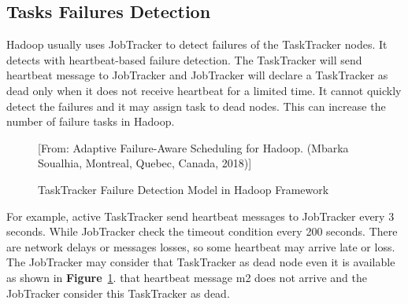 \documentclass[12pt,oneside,openright,a4paper]{cpe-english-project}
\begin{document}
\subsection{Tasks Failures Detection}
\hspace{10mm}Hadoop usually uses JobTracker to detect failures of the TaskTracker nodes.  It detects with heartbeat-based failure detection.  The TaskTracker will send heartbeat message to JobTracker and JobTracker will declare a TaskTracker as dead only when it does not receive heartbeat for a limited time.  It cannot quickly detect the failures and it may assign task to dead nodes.  This can increase the number of failure tasks in Hadoop. \cite{adaptiveScheduling}

\begin{figure}[!h]\centering
  \setlength{\fboxrule}{0mm} %
  \setlength{\fboxsep}{0cm}
  \caption{TaskTracker Failure Detection Model in Hadoop Framework}\label{fig:tasktracker}
  [From: Adaptive Failure-Aware Scheduling for Hadoop. (Mbarka Soualhia, Montreal, Quebec, Canada, 2018)]
\end{figure}

\hspace{10mm}For example, active TaskTracker send heartbeat messages to JobTracker every 3 seconds.  While JobTracker check the timeout condition every 200 seconds.  There are network delays or messages losses, so some heartbeat may arrive late or loss.  The JobTracker may consider that TaskTracker as dead node even it is available as shown in \textbf{Figure}~\ref{fig:tasktracker}. that heartbeat message m2 does not arrive and the JobTracker consider this TaskTracker as dead.

\newpage

\end{document}
